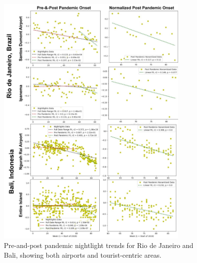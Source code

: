 \begin{figure}[!htb] 
\centering
\includegraphics[width=0.85\textwidth]{Figures/chap5/Nightlights_Graphs.png}
\caption[Nightlight Trends for Rio de Janeiro and Bali]{Pre-and-post pandemic nightlight trends for Rio de Janeiro and Bali, showing both airports and tourist-centric areas.}
\label{fig:nlg}
\end{figure}

